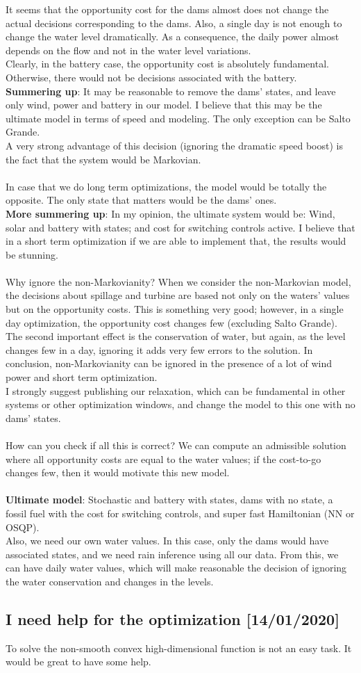 \documentclass[12pt]{article}
\theoremstyle{definition}
\theoremstyle{remark}
\begin{document}
It seems that the opportunity cost for the dams almost does not change the actual decisions corresponding to the dams. Also, a single day is not enough to change the water level dramatically. As a consequence, the daily power almost depends on the flow and not in the water level variations.\\
Clearly, in the battery case, the opportunity cost is absolutely fundamental. Otherwise, there would not be decisions associated with the battery.\\
\textbf{Summering up}: It may be reasonable to remove the dams' states, and leave only wind, power and battery in our model. I believe that this may be the ultimate model in terms of speed and modeling. The only exception can be Salto Grande.\\
A very strong advantage of this decision (ignoring the dramatic speed boost) is the fact that the system would be Markovian.\\
\quad\\
In case that we do long term optimizations, the model would be totally the opposite. The only state that matters would be the dams' ones.
\quad\\
\textbf{More summering up}:  In my opinion, the ultimate system would be: Wind, solar and battery with states; and cost for switching controls active. I believe that in a short term optimization if we are able to implement that, the results would be stunning.\\
\quad\\
Why ignore the non-Markovianity? When we consider the non-Markovian model, the decisions about spillage and turbine are based not only on the waters' values but on the opportunity costs. This is something very good; however, in a single day optimization, the opportunity cost changes few (excluding Salto Grande). The second important effect is the conservation of water, but again, as the level changes few in a day, ignoring it adds very few errors to the solution. In conclusion, non-Markovianity can be ignored in the presence of a lot of wind power and short term optimization.\\
I strongly suggest publishing our relaxation, which can be fundamental in other systems or other optimization windows, and change the model to this one with no dams' states.\\
\quad\\
How can you check if all this is correct? We can compute an admissible solution where all opportunity costs are equal to the water values; if the cost-to-go changes few, then it would motivate this new model.\\
\quad\\
\textbf{Ultimate model}: Stochastic and battery with states, dams with no state, a fossil fuel with the cost for switching controls, and super fast Hamiltonian (NN or OSQP).\\
Also, we need our own water values. In this case, only the dams would have associated states, and we need rain inference using all our data. From this, we can have daily water values, which will make reasonable the decision of ignoring the water conservation and changes in the levels.

\subsection*{I need help for the optimization [14/01/2020]}

To solve the non-smooth convex high-dimensional function is not an easy task. It would be great to have some help.
\end{document}
